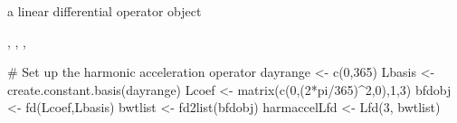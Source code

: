 \documentclass{article}
\begin{document}
\begin{Value}
a linear differential operator object
\end{Value}
\begin{SeeAlso}\relax
{}, 
, 
, 
\end{SeeAlso}
\begin{Examples}
\begin{ExampleCode}
#  Set up the harmonic acceleration operator
dayrange  <- c(0,365)
Lbasis  <- create.constant.basis(dayrange)
Lcoef   <- matrix(c(0,(2*pi/365)^2,0),1,3)
bfdobj  <- fd(Lcoef,Lbasis)
bwtlist <- fd2list(bfdobj)
harmaccelLfd <- Lfd(3, bwtlist)
\end{ExampleCode}
\end{Examples}
\end{document}
